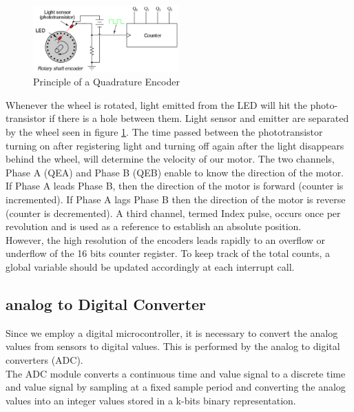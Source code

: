 \begin{figure}[H]
    \centering
    \includegraphics[width=0.5\textwidth]{figures/software/qei_demo.png}
    \caption{Principle of a Quadrature Encoder \cite{alex}}
    \label{fig:qei_demo}
\end{figure}
\vskip 0.2in
\noindent
Whenever the wheel is rotated, light emitted from the LED will hit the photo-transistor if there is a hole between them. Light sensor and emitter are separated by the wheel seen in figure \ref{fig:qei_demo}. The time passed between the phototransistor turning on after registering light and turning off again after the light disappears behind the wheel, will determine the velocity of our motor.
\vskip 0.2in
\noindent
The two channels, Phase A (QEA) and Phase B (QEB) enable to know the direction of the motor. If Phase A leads Phase B, then the direction of the motor is forward (counter is incremented). If Phase A lags Phase B then the direction of the motor is reverse (counter is decremented). A third channel, termed Index pulse, occurs once per revolution and is used as a reference to establish an absolute position.\\
However, the high resolution of the encoders leads rapidly to an overflow or underflow of the 16 bits counter register. To keep track of the total counts, a global variable should be updated accordingly at each interrupt call.

\subsection{analog to Digital Converter}

Since we employ a digital microcontroller, it is necessary to convert the analog values from sensors to digital values. This is performed by the analog to digital converters (ADC).\\
The ADC module converts a continuous time and value signal to a discrete time and value signal by sampling at a fixed sample period and converting the analog values into an integer values stored in a k-bits binary representation.

